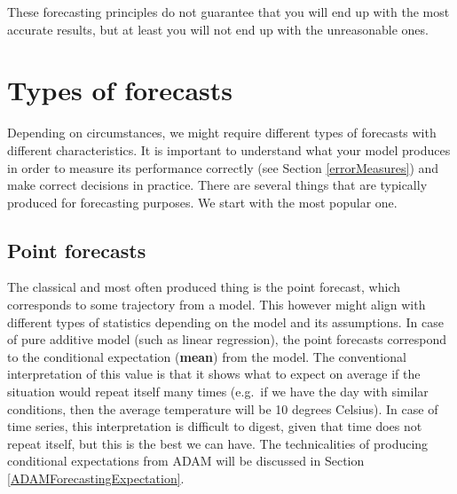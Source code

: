 \documentclass[
]{book}
\theoremstyle{definition}
\theoremstyle{definition}
\theoremstyle{definition}
\theoremstyle{definition}
\theoremstyle{remark}
\begin{document}
These forecasting principles do not guarantee that you will end up with the most accurate results, but at least you will not end up with the unreasonable ones.

\hypertarget{types-of-forecasts}{%
\section{Types of forecasts}\label{types-of-forecasts}}

Depending on circumstances, we might require different types of forecasts with different characteristics. It is important to understand what your model produces in order to measure its performance correctly (see Section \ref{errorMeasures}) and make correct decisions in practice. There are several things that are typically produced for forecasting purposes. We start with the most popular one.

\hypertarget{point-forecasts}{%
\subsection{Point forecasts}\label{point-forecasts}}

The classical and most often produced thing is the point forecast, which corresponds to some trajectory from a model. This however might align with different types of statistics depending on the model and its assumptions. In case of pure additive model (such as linear regression), the point forecasts correspond to the conditional expectation (\textbf{mean}) from the model. The conventional interpretation of this value is that it shows what to expect on average if the situation would repeat itself many times (e.g.~if we have the day with similar conditions, then the average temperature will be 10 degrees Celsius). In case of time series, this interpretation is difficult to digest, given that time does not repeat itself, but this is the best we can have. The technicalities of producing conditional expectations from ADAM will be discussed in Section \ref{ADAMForecastingExpectation}.
\end{document}
